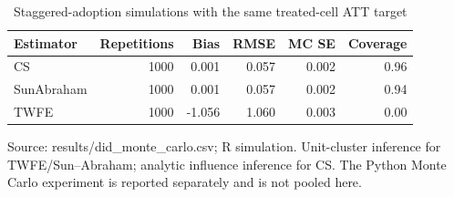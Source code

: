 \begin{table}[htbp]
\centering
\small
\caption{Staggered-adoption simulations with the same treated-cell ATT target}
\begin{tabularx}{\linewidth}{Xrrrrr}
\toprule
Estimator & Repetitions & Bias & RMSE & MC SE & Coverage \\
\midrule
CS & 1000 & 0.001 & 0.057 & 0.002 & 0.96 \\
SunAbraham & 1000 & 0.001 & 0.057 & 0.002 & 0.94 \\
TWFE & 1000 & -1.056 & 1.060 & 0.003 & 0.00 \\
\bottomrule
\end{tabularx}
\par\vspace{3pt}\begin{minipage}{\linewidth}\footnotesize Source: results/did\_\allowbreak{}monte\_\allowbreak{}carlo.\allowbreak{}csv; R simulation.\allowbreak{} Unit-cluster inference for TWFE/Sun–Abraham; analytic influence inference for CS.\allowbreak{} The Python Monte Carlo experiment is reported separately and is not pooled here.\allowbreak{}\end{minipage}
\end{table}
